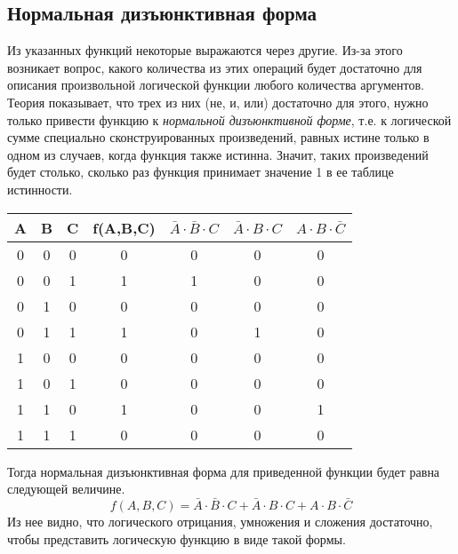 \documentclass[a4paper, fleqn]{article}
\begin{document}
	
	\subsection*{Нормальная дизъюнктивная форма}
	
	Из указанных функций некоторые выражаются через другие. Из-за этого возникает вопрос, какого количества из этих операций будет достаточно для описания произвольной логической функции любого количества аргументов. Теория показывает, что трех из них (не, и, или) достаточно для этого, нужно только привести функцию к \emph{нормальной дизъюнктивной форме}, т.е. к логической сумме специально сконструированных произведений, равных истине только в одном из случаев, когда функция также истинна. Значит, таких произведений будет столько, сколько раз функция принимает значение 1 в ее таблице истинности.
	
	\begin{tabular}{ccc|c|c|c|c}
		A&  B&  C&  f(A,B,C)&  $\bar{A}\cdot \bar{B}\cdot C$&  $\bar{A}\cdot B \cdot C$&  $A\cdot B \cdot \bar{C}$\\
		\hline
		0&  0&  0&  0&  0&  0&  0\\ 
		0&  0&  1&  1&  1&  0&  0\\ 
		0&  1&  0&  0&  0&  0&  0\\ 
		0&  1&  1&  1&  0&  1&  0\\ 
		1&  0&  0&  0&  0&  0&  0\\ 
		1&  0&  1&  0&  0&  0&  0\\ 
		1&  1&  0&  1&  0&  0&  1\\ 
		1&  1&  1&  0&  0&  0&  0\\ 
	\end{tabular} 
	
	Тогда нормальная дизъюнктивная форма для приведенной функции будет равна следующей величине.
	\[f(A, B, C) = \bar{A}\cdot \bar{B}\cdot C + \bar{A}\cdot B \cdot C + A\cdot B \cdot \bar{C}\]
	Из нее видно, что логического отрицания, умножения и сложения достаточно, чтобы представить логическую функцию в виде такой формы.
	
\end{document}
